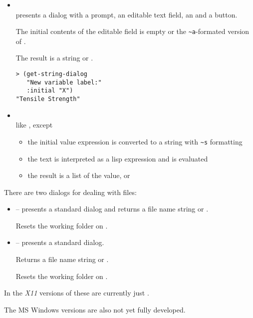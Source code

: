 \begin{slide}{}
\begin{itemize}
\item
{}\\
presents a dialog with a prompt, an editable text field, an
 and a  button.

The initial contents of the editable field is empty or the
\verb+~a+-formated version of .

The result is a string or .
{\Large
\begin{verbatim}
> (get-string-dialog
   "New variable label:"
   :initial "X")
"Tensile Strength"
\end{verbatim}}
\item
{}\\
like , except
\begin{itemize}
\item
the initial value expression is converted to a string with \verb+~s+
formatting
\item
the text is interpreted as a lisp expression and is evaluated
\item
the result is a list of the value, or 
\end{itemize}
\end{itemize}
\end{slide}

\begin{slide}{}
There are two dialogs for dealing with files:
\begin{itemize}
\item
{} -- presents a standard 
dialog and returns a file name string or .

Resets the working folder on .
\item
{} -- presents a standard
 dialog.

Returns a file name string or .

Resets the working folder on .
\end{itemize}
In the {\em X11}\/ versions of these are currently just
.

The MS Windows versions are also not yet fully developed.
\end{slide}

